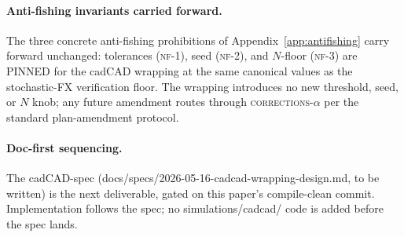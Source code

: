 \documentclass[11pt,letterpaper]{article}
\begin{document}
\paragraph{Anti-fishing invariants carried forward.}
The three concrete anti-fishing prohibitions of
Appendix~\ref{app:antifishing} carry forward unchanged: tolerances
(\textsc{nf-1}), seed (\textsc{nf-2}), and $N$-floor (\textsc{nf-3})
are PINNED for the cadCAD wrapping at the same canonical values as
the stochastic-FX verification floor. The wrapping introduces no new
threshold, seed, or $N$ knob; any future amendment routes through
\textsc{corrections-$\alpha$} per the standard plan-amendment protocol.

\paragraph{Doc-first sequencing.}
The cadCAD-spec
(\textsf{docs/specs/2026-05-16-cadcad-wrapping-design.md}, to be
written) is the next deliverable, gated on this paper's compile-clean
commit. Implementation follows the spec; no \textsf{simulations/cadcad/}
code is added before the spec lands.
\end{document}
